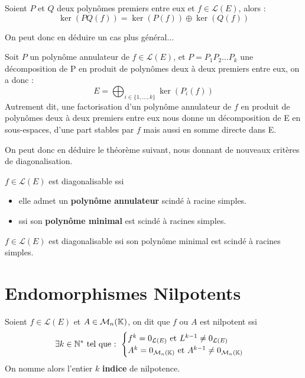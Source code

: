 \begin{lemma}[Noyaux]
    Soient $P$ et $Q$ deux polynômes premiers entre eux et $f \in \mathcal{L}(E)$, alors :
        \[ \boxed{\ker (PQ(f)) = \ker(P(f)) \oplus \ker(Q(f))} \] 
\end{lemma}

On peut donc en déduire un cas plus général... 

\begin{theorem}
    Soit $P$ un polynôme annulateur de $f \in \mathcal{L}(E)$, et $P = P_1P_2 \dots P_k$ une décomposition de P en produit de polynômes 
    deux à deux premiers entre eux, on a donc :
        \[E = \bigoplus_{i \in \{1,\dots, k\}} \ker (P_i(f))\]
    Autrement dit, une factorisation d'un polynôme annulateur de $f$ en produit de polynômes deux à deux premiers entre eux 
    nous donne un décomposition de E en sous-espaces, d'une part stables par $f$ mais aussi en somme directe dans E. 
\end{theorem}

On peut donc en déduire le théorème suivant, nous donnant de nouveaux critères de diagonalisation. 

\begin{theorem}
    $f \in \mathcal{L}(E)$ est diagonalisable ssi 
    \begin{itemize}
        \item elle admet un \textbf{polynôme annulateur} scindé à racine simples. 
        \item ssi son \textbf{polynôme minimal} est scindé à racines simples. 
    \end{itemize}
\end{theorem}

\begin{criteria}
    $f \in \mathcal{L}(E)$ est diagonalisable ssi son polynôme minimal est scindé à racines simples. 
\end{criteria}



\section{Endomorphismes Nilpotents}

\begin{definition}
    Soient $f \in \mathcal{L}(E)$ et $A \in \mathcal{M}_n(\mathbb{K})$, on dit que $f$ ou $A$ est nilpotent ssi 
        \[ \exists k \in \mathbb{N}^* \text{ tel que : }
            \begin{cases}
                f^k = 0_{\mathcal{L}(E)} \text{ et } L^{k-1} \not = 0_{\mathcal{L}(E)} \\ 
                A^k = 0_{\mathcal{M}_n(\mathbb{K})} \text{ et } A^{k-1} \not = 0_{\mathcal{M}_n(\mathbb{K})}
            \end{cases}
        \]
    On nomme alors l'entier $k$ \textbf{indice} de nilpotence. 
\end{definition}

